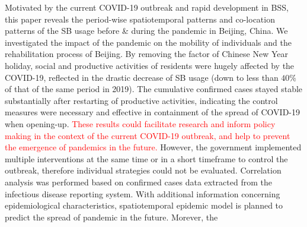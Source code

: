 \documentclass[preprints,ijgi,submit,moreauthors]{Definitions/mdpi}
\begin{document}
Motivated by the current COVID-19 outbreak and rapid development in BSS, this paper reveals the period-wise spatiotemporal patterns and co-location patterns of the SB usage before \& during the pandemic in Beijing, China.
We investigated the impact of the pandemic on the mobility of individuals and the rehabilitation process of Beijing.
By removing the factor of Chinese New Year holiday, social and productive activities of residents were hugely affected by the COVID-19, reflected in the drastic decrease of SB usage (down to less than $40\%$ of that of the same period in 2019). 
The cumulative confirmed cases stayed stable substantially after restarting of productive activities, indicating the control measures were necessary and effective in containment of the spread of COVID-19 when opening-up.
\textcolor{red}{These results could facilitate research and inform policy making in the context of the current COVID-19 outbreak, and help to prevent the emergence of pandemics in the future.} 
However, the government implemented multiple interventions at the same time or in a short timeframe to control the outbreak, therefore individual strategies could not be evaluated.
Correlation analysis was performed based on confirmed cases data extracted from the infectious disease reporting system. 
With additional information concerning epidemiological characteristics, spatiotemporal epidemic model is planned to predict the spread of pandemic in the future.
Morever, the
\vspace{6pt} 



\end{document}
